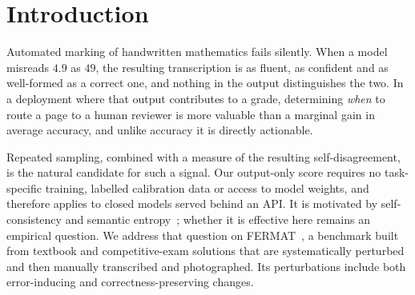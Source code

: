 \documentclass[10pt,twocolumn,letterpaper]{article}
\begin{document}
\section{Introduction}
%
Automated marking of handwritten mathematics fails silently. When a model
misreads $4.9$ as $49$, the resulting transcription is as fluent, as
confident and as well-formed as a correct one, and nothing in the output
distinguishes the two. In a deployment where that output contributes to a
grade, determining \emph{when} to route a page to a human reviewer is more
valuable than a marginal gain in average accuracy, and unlike accuracy it
is directly actionable.

Repeated sampling, combined with a measure of the resulting
self-disagreement, is the natural candidate for such a signal. Our
output-only score requires no task-specific training, labelled
calibration data or access to model weights, and therefore applies to
closed models served behind an API. It is motivated by self-consistency
and semantic entropy~\cite{selfconsistency,semanticentropy}; whether it is
effective here remains an empirical question. We address that question on
FERMAT~\cite{fermat}, a benchmark built from textbook and competitive-exam
solutions that are systematically perturbed and then manually transcribed
and photographed. Its perturbations include both error-inducing and
correctness-preserving changes.
\end{document}
